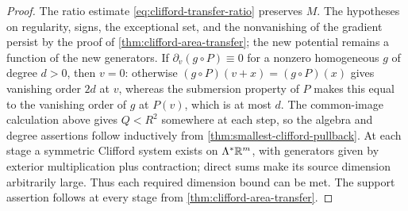\begin{proof}
The ratio estimate \eqref{eq:clifford-transfer-ratio} preserves $M$.
The hypotheses on regularity, signs, the exceptional set, and the
nonvanishing of the gradient persist by the proof of \cref{thm:clifford-area-transfer};
the new potential remains a function of the new generators.
If $\partial_v(g\circ P)\equiv0$ for a nonzero homogeneous $g$
of degree $d>0$, then $v=0$: otherwise
$(g\circ P)(v+x)=(g\circ P)(x)$ gives vanishing order $2d$ at $v$,
whereas the submersion property of $P$ makes this equal to the
vanishing order of $g$ at $P(v)$, which is at most $d$.
The common-image calculation above gives $Q<R^2$ somewhere at each
step, so the algebra and degree assertions follow inductively from
\cref{thm:smallest-clifford-pullback}. At each stage a symmetric
Clifford system exists on $\Lambda^*\mathbb R^m$, with generators given by
exterior multiplication plus contraction; direct sums make its source
dimension arbitrarily large. Thus each required dimension bound can
be met. The support assertion follows at every stage from
\cref{thm:clifford-area-transfer}.
\end{proof}
